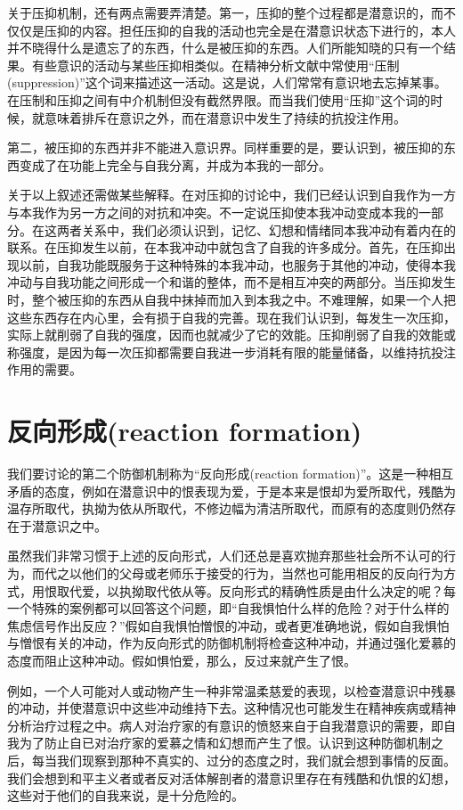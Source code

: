 \documentclass[UTF8,10pt,a4paper,openany]{book}
\begin{document}
关于压抑机制，还有两点需要弄清楚。第一，压抑的整个过程都是潜意识的，而不仅仅是压抑的内容。担任压抑的自我的活动也完全是在潜意识状态下进行的，本人并不晓得什么是遗忘了的东西，什么是被压抑的东西。人们所能知晓的只有一个结果。有些意识的活动与某些压抑相类似。在精神分析文献中常使用“压制(suppression)”这个词来描述这一活动。这是说，人们常常有意识地去忘掉某事。在压制和压抑之间有中介机制但没有截然界限。而当我们使用“压抑”这个词的时候，就意味着排斥在意识之外，而在潜意识中发生了持续的抗投注作用。

第二，被压抑的东西并非不能进入意识界。同样重要的是，要认识到，被压抑的东西变成了在功能上完全与自我分离，并成为本我的一部分。

关于以上叙述还需做某些解释。在对压抑的讨论中，我们已经认识到自我作为一方与本我作为另一方之间的对抗和冲突。不一定说压抑使本我冲动变成本我的一部分。在这两者关系中，我们必须认识到，记忆、幻想和情绪同本我冲动有着内在的联系。在压抑发生以前，在本我冲动中就包含了自我的许多成分。首先，在压抑出现以前，自我功能既服务于这种特殊的本我冲动，也服务于其他的冲动，使得本我冲动与自我功能之间形成一个和谐的整体，而不是相互冲突的两部分。当压抑发生时，整个被压抑的东西从自我中抹掉而加入到本我之中。不难理解，如果一个人把这些东西存在内心里，会有损于自我的完善。现在我们认识到，每发生一次压抑，实际上就削弱了自我的强度，因而也就减少了它的效能。压抑削弱了自我的效能或称强度，是因为每一次压抑都需要自我进一步消耗有限的能量储备，以维持抗投注作用的需要。

\section*{反向形成(reaction formation)}
我们要讨论的第二个防御机制称为“反向形成(reaction formation)”。这是一种相互矛盾的态度，例如在潜意识中的恨表现为爱，于是本来是恨却为爱所取代，残酷为温存所取代，执拗为依从所取代，不修边幅为清洁所取代，而原有的态度则仍然存在于潜意识之中。

虽然我们非常习惯于上述的反向形式，人们还总是喜欢抛弃那些社会所不认可的行为，而代之以他们的父母或老师乐于接受的行为，当然也可能用相反的反向行为方式，用恨取代爱，以执拗取代依从等。反向形式的精确性质是由什么决定的呢？每一个特殊的案例都可以回答这个问题，即“自我惧怕什么样的危险？对于什么样的焦虑信号作出反应？”假如自我惧怕憎恨的冲动，或者更准确地说，假如自我惧怕与憎恨有关的冲动，作为反向形式的防御机制将检查这种冲动，并通过强化爱慕的态度而阻止这种冲动。假如惧怕爱，那么，反过来就产生了恨。

例如，一个人可能对人或动物产生一种非常温柔慈爱的表现，以检查潜意识中残暴的冲动，并使潜意识中这些冲动维持下去。这种情况也可能发生在精神疾病或精神分析治疗过程之中。病人对治疗家的有意识的愤怒来自于自我潜意识的需要，即自我为了防止自已对治疗家的爱慕之情和幻想而产生了恨。认识到这种防御机制之后，每当我们现察到那种不真实的、过分的态度之时，我们就会想到事情的反面。我们会想到和平主义者或者反对活体解剖者的潜意识里存在有残酷和仇恨的幻想，这些对于他们的自我来说，是十分危险的。
\end{document}
